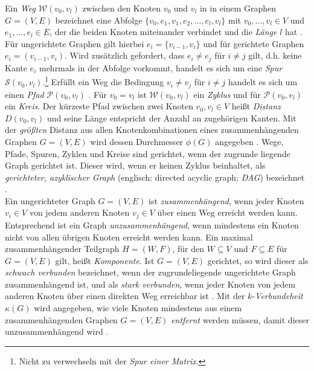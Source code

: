 \documentclass[12pt, a4paper]{report}
\begin{document}
Ein \textit{Weg} $\mathcal{W}(v_0,v_l)$ zwischen den Knoten $v_0$ und $v_l$ in in einem Graphen $G=(V,E)$ bezeichnet eine Abfolge $\{v_0, e_1, v_1, e_2, \dots,e_l,v_l \}$ mit $v_0, \dots, v_l \in V$ und $e_1,\dots,e_l \in E$, der die beiden Knoten miteinander verbindet und die \textit{Länge} $l$ hat \cite{diestel2006graph}. Für ungerichtete Graphen gilt hierbei $e_i=\{v_{i-1}, v_i\}$ und für gerichtete Graphen $e_i=(v_{i-1}, v_i)$. Wird zusätzlich gefordert, dass $e_i \neq e_j$ für $i \neq j$ gilt, d.h. keine Kante $e_i$ mehrmals in der Abfolge vorkommt, handelt es sich um eine \textit{Spur} $\mathcal{S}(v_0,v_l)$.\footnote{Nicht zu verwechseln mit der \textit{Spur einer Matrix}.} Erfüllt ein Weg die Bedingung $v_i \neq v_j$ für $i \neq j$ handelt es sich um einen \textit{Pfad} $\mathcal{P}(v_0,v_l)$  \cite{brandes2005graphfunda}. Für $v_0 = v_l$ ist $\mathcal{W}(v_0,v_l)$ ein \textit{Zyklus} und für $\mathcal{P}(v_0,v_l)$ ein \textit{Kreis}. Der kürzeste Pfad zwischen zwei Knoten $v_0,v_l \in V$ heißt \textit{Distanz} $D(v_0,v_l)$ und seine Länge entspricht der Anzahl an zugehörigen Kanten. Mit der \textit{größten} Distanz aus allen Knotenkombinationen eines zusammenhängenden Graphen $G=(V,E)$ wird dessen Durchmesser $\phi(G)$ angegeben \cite{diestel2006graph}. Wege, Pfade, Spuren, Zyklen und Kreise sind gerichtet, wenn der zugrunde liegende Graph gerichtet ist. Dieser wird, wenn er keinen Zyklus beinhaltet, als \textit{gerichteter, azyklischer Graph}  (englisch: directed acyclic graph; \textit{DAG}) bezeichnet \cite{kolaczyk2009statistical}.\\

Ein ungerichteter Graph $G=(V,E)$ ist \textit{zusammenhängend}, wenn jeder Knoten $v_i \in V$ von jedem anderen Knoten $v_j \in V$ über einen Weg erreicht werden kann. Entsprechend ist ein Graph \textit{unzusammenhängend}, wenn mindestens ein Knoten nicht von allen übrigen Knoten erreicht werden kann. Ein maximal zusammenhängender Teilgraph $H=(W,F)$, für den $W \subseteq V$ und $F \subseteq E$ für $G=(V,E)$ gilt, heißt \textit{Komponente}. Ist $G=(V,E)$ gerichtet, so wird dieser als \textit{schwach verbunden} bezeichnet, wenn der zugrundeliegende ungerichtete Graph zusammenhängend ist, und als \textit{stark verbunden}, wenn jeder Knoten von jedem anderen Knoten über einen direkten Weg erreichbar ist \cite{brandes2005graphfunda}. Mit der $k$-\textit{Verbundeheit} $\kappa(G)$ wird angegeben, wie viele Knoten mindestens aus einem zusammenhängenden Graphen $G=(V,E)$ \textit{entfernt} werden müssen, damit dieser unzusammenhängend wird \cite{diestel2006graph}.\\
\end{document}
